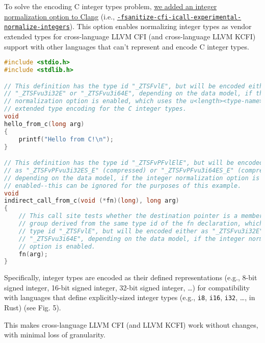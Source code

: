 \documentclass{article}
\begin{document}
To solve the encoding C integer types problem, \href{https://reviews.llvm.org/D139395}{we added an integer normalization option to Clang} (i.e., \href{https://clang.llvm.org/docs/ControlFlowIntegrity.html#fsanitize-cfi-icall-experimental-normalize-integers}{\texttt{-fsanitize-cfi-icall-experimental-normalize-integers}}). This option enables normalizing integer types as vendor extended types for cross-language LLVM CFI (and cross-language LLVM KCFI) support with other languages that can’t represent and encode C integer types.

\begin{lstlisting}[language=C, caption={Example C library using C integer types and Clang encoding with the integer normalization option enabled.}]
#include <stdio.h>
#include <stdlib.h>

// This definition has the type id "_ZTSFvlE", but will be encoded either as
// "_ZTSFvu3i32E" or "_ZTSFvu3i64E", depending on the data model, if the integer
// normalization option is enabled, which uses the u<length><type-name> vendor
// extended type encoding for the C integer types.
void
hello_from_c(long arg)
{
    printf("Hello from C!\n");
}

// This definition has the type id "_ZTSFvPFvlElE", but will be encoded either
// as "_ZTSFvPFvu3i32ES_E" (compressed) or "_ZTSFvPFvu3i64ES_E" (compressed),
// depending on the data model, if the integer normalization option is
// enabled--this can be ignored for the purposes of this example.
void
indirect_call_from_c(void (*fn)(long), long arg)
{
    // This call site tests whether the destination pointer is a member of the
    // group derived from the same type id of the fn declaration, which has the
    // type id "_ZTSFvlE", but will be encoded either as "_ZTSFvu3i32E" or
    // "_ZTSFvu3i64E", depending on the data model, if the integer normalization
    // option is enabled.
    fn(arg);
}
\end{lstlisting}

Specifically, integer types are encoded as their defined representations (e.g., 8-bit signed integer, 16-bit signed integer, 32-bit signed integer, …) for compatibility with languages that define explicitly-sized integer types (e.g., \texttt{i8}, \texttt{i16}, \texttt{i32}, …, in Rust) (see Fig. 5).

This makes cross-language LLVM CFI (and LLVM KCFI) work without changes, with minimal loss of granularity.\footnotemark[4]

\end{document}

